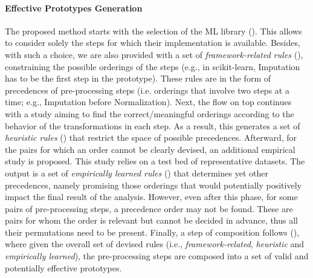 
\paragraph{Effective Prototypes Generation} The proposed method starts with the selection of the ML library ().
This allows to consider solely the steps for which their implementation is available.
Besides, with such a choice, we are also provided with a set of \textit{framework-related rules} (), constraining the possible orderings of the steps (e.g., in scikit-learn, Imputation has to be the first step in the prototype).
These rules are in the form of precedences of pre-processing steps (i.e. orderings that involve two steps at a time;  e.g., Imputation before Normalization).
Next, the flow on top continues with a study
aiming to find the correct/meaningful orderings according to
the behavior of the transformations in each step.
As a result, this generates a set of \textit{heuristic rules} () that restrict the space of possible precedences.
Afterward, for the pairs for which an order cannot be clearly devised, an additional empirical study is proposed.
This study relies on a test bed of representative datasets.
The output is a set of \textit{empirically learned rules} () that determines yet other precedences, namely promising those orderings that would potentially positively impact the final result of the analysis.
However, even after this phase, for some pairs of pre-processing steps, a precedence order may not be found.
These are pairs for whom the order is relevant but cannot be decided in advance, thus all their permutations need to be present.
Finally, a step of composition follows  (), where given the overall set of devised rules (i.e., \textit{framework-related}, \textit{heuristic} and \textit{empirically learned}), the pre-processing steps are composed into a set of valid and potentially effective prototypes.

